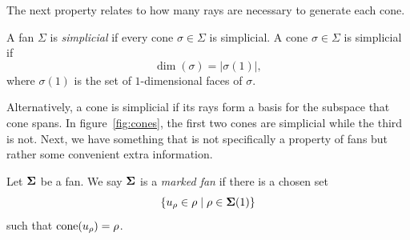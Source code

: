\documentclass[12pt,oneside]{../../sfsuthesis}
\begin{document}
The next property relates to how many rays are necessary to generate each cone.
\begin{definition}\th\label{def:simplicial}
    A fan \( \Sigma \) is \emph{simplicial} if every cone \( \sigma \in \Sigma \) is simplicial.
    A cone \( \sigma \in \Sigma \) is simplicial if
    \[
        \dim (\sigma)  = |\sigma(1)|,
    \]
    where \( \sigma(1) \) is the set of \( 1 \)-dimensional faces of \( \sigma \).
\end{definition}
Alternatively, a cone is simplicial if its rays form a basis for the subspace that cone spans.
In figure~\ref{fig:cones}, the first two cones are simplicial while the third is not.
Next, we have something that is not specifically a property of fans but rather some convenient extra information.
\begin{definition}\th\label{marked}
    Let \( {\bm{\Sigma}} \) be a fan.
    We say \( {\bm{\Sigma}} \) is a \emph{marked fan} if there is a chosen set
    \[
        \left\{ u_\rho \in \rho \; \middle| \; \rho \in {\bm{\Sigma}}(1) \right\}
    \]
    such that \( \mathrm{cone}(u_\rho) = \rho \).
\end{definition}
\end{document}
